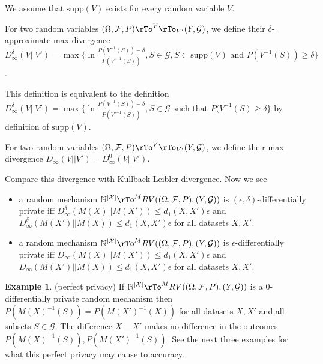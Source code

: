 \documentclass[12pt]{amsart}
\theoremstyle{definition}
\newtheorem{example}[theorem]{Example}
\begin{document}
We assume that $\text{supp}(V)$ exists for every random variable $V$.

\dfn \label{delta_max_divergence} For two random variables $(\Omega, \mathcal{F}, P) \pile{\rTo^V \\ \rTo_{V'}} (Y, \mathcal{G})$, we define their $\delta$-approximate max divergence $D_{\infty}^{\delta} (V || V') = \max \{\ln \frac{P(V^{-1}(S)) - \delta}{P(V'^{-1}(S))}, S \in \mathcal{G}, S \subset \text{supp}(V) \text{ and } P(V^{-1}(S)) \geq \delta\}$.

This definition is equivalent to the definition $D_{\infty}^{\delta} (V || V') = \max \{\ln \frac{P(V^{-1}(S)) - \delta}{P(V'^{-1}(S))}, S \in \mathcal{G} \text{ such that } P(V^{-1}(S) \geq \delta\}$ by definition of $\text{supp}(V)$.

\dfn \label{max_divergence} For two random variables $(\Omega, \mathcal{F}, P) \pile{\rTo^V \\ \rTo_{V'}} (Y, \mathcal{G})$, we define their max divergence $D_{\infty} (V || V') = D_{\infty}^{0} (V || V')$.

Compare this divergence with Kullback-Leibler divergence. Now we see
\begin{itemize}
\item a random mechanism $\mathbb{N}^{|\mathcal{X}|} \rTo^M RV((\Omega, \mathcal{F}, P), (Y, \mathcal{G}))$ is $(\epsilon, \delta)$-differentially private iff $D_{\infty}^{\delta} (M(X) || M(X')) \leq d_1(X, X') \epsilon$ and $D_{\infty}^{\delta} (M(X') || M(X)) \leq d_1(X, X') \epsilon$ for all datasets $X, X'$.
\item a random mechanism $\mathbb{N}^{|\mathcal{X}|} \rTo^M RV((\Omega, \mathcal{F}, P), (Y, \mathcal{G}))$ is $\epsilon$-differentially private iff $D_{\infty}(M(X) || M(X')) \leq d_1(X, X') \epsilon$ and $D_{\infty}(M(X') || M(X)) \leq d_1(X, X') \epsilon$ for all datasets $X, X'$.
\end{itemize}

\begin{example} \label{perfect_privacy} (perfect privacy) If $\mathbb{N}^{|\mathcal{X}|} \rTo^M RV((\Omega, \mathcal{F}, P), (Y, \mathcal{G}))$ is a $0$-differentially private random mechanism then $P(M(X)^{-1}(S)) = P(M(X')^{-1}(X))$ for all datasets $X, X'$ and all subsets $S \in \mathcal{G}$. The difference $X - X'$ makes no difference in the outcomes $P(M(X)^{-1}(S)), P(M(X')^{-1}(S))$. See the next three examples for what this perfect privacy may cause to accuracy.
\end{example}
\end{document}

